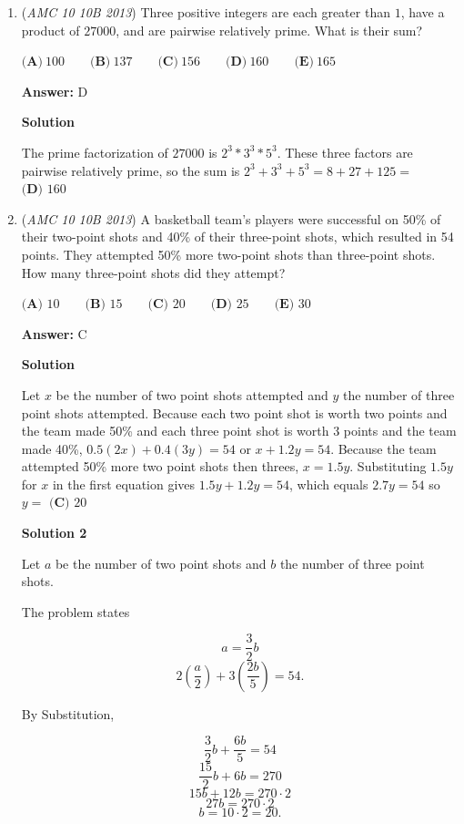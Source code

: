 \begin{enumerate}
	\item (\textit{AMC 10 10B 2013}) Three positive integers are each greater than $1$, have a product of $27000$, and are pairwise relatively prime. What is their sum?


 $\textbf{(A)}\ 100\qquad\textbf{(B)}\ 137\qquad\textbf{(C)}\ 156\qquad\textbf{(D)}\ 160\qquad\textbf{(E)}\ 165$

 \textbf{Answer: }D



\textbf{Solution}

The prime factorization of $27000$ is $2^3*3^3*5^3$. These three factors are pairwise relatively prime, so the sum is $2^3+3^3+5^3=8+27+125=$ $\boxed{\textbf{(D) }160}$



	\item (\textit{AMC 10 10B 2013}) A basketball team's players were successful on 50\% of their two-point shots and 40\% of their three-point shots, which resulted in 54 points. They attempted 50\% more two-point shots than three-point shots. How many three-point shots did they attempt?


 $\textbf{(A) }10\qquad\textbf{(B) }15\qquad\textbf{(C) }20\qquad\textbf{(D) }25\qquad\textbf{(E) }30$

 \textbf{Answer: }C



\textbf{Solution}

Let $x$ be the number of two point shots attempted and $y$ the number of three point shots attempted. Because each two point shot is worth two points and the team made 50\% and each three point shot is worth 3 points and the team made 40\%, $0.5(2x)+0.4(3y)=54$ or $x+1.2y=54$. Because the team attempted 50\% more two point shots then threes, $x=1.5y$. Substituting $1.5y$ for $x$ in the first equation gives $1.5y+1.2y=54$, which equals $2.7y=54$ so $y=$ $\boxed{\textbf{(C) }20}$




\textbf{Solution 2}

Let $a$ be the number of two point shots and $b$ the number of three point shots.

 The problem states 

 
 \[a = \frac{3}{2}b\]
 \[2(\frac{a}{2}) + 3(\frac{2b}{5}) = 54.\]

 By Substitution,

 
 \[\frac{3}{2}b + \frac{6b}{5} = 54\]
 \[\frac{15}{2}b + 6b = 270\]
 \[15b+12b = 270 \cdot 2\]
 \[27b = 270 \cdot 2\]
 \[b = 10 \cdot 2 = \boxed{20}.\]




\end{enumerate}
